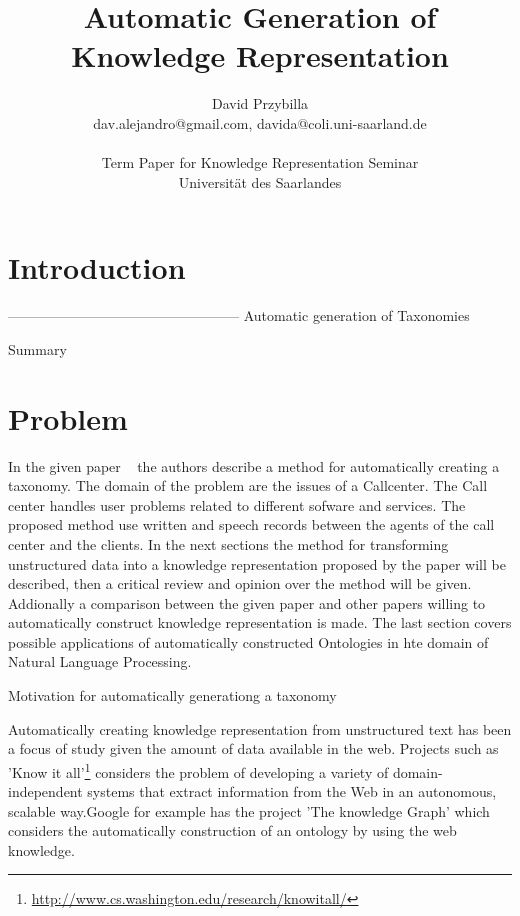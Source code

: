 \documentclass[4pt,a4paper,twocolumn]{article}
\author{David Przybilla\\dav.alejandro@gmail.com, davida@coli.uni-saarland.de\\ \\ Term Paper for Knowledge Representation Seminar\\ Universit\"{a}t des Saarlandes}
\title{Automatic Generation of Knowledge Representation}
\begin{document}
\twocolumn[
	 \begin{@twocolumnfalse}
    \maketitle
  \end{@twocolumnfalse}
 ]




\section{Introduction}





--------------------------------------------------
Automatic generation of Taxonomies

Summary

\section{Problem}
In the given paper ~\cite{Roy:2006:AGD:1220175.1220268} the authors describe a method for automatically creating a taxonomy.
The domain of the problem are the issues of a Callcenter. The Call center handles user problems related to different sofware and services.
The proposed method use  written and speech records between the agents of the call center and the clients. 
In the next sections  the method for transforming unstructured data into a knowledge representation proposed by the paper will be described,
then a critical review and opinion over the method will be given. Addionally a comparison between the given paper and other papers willing to automatically construct knowledge representation is made.
The last section covers  possible applications of automatically constructed Ontologies in hte domain of Natural Language Processing.


Motivation for automatically generationg a taxonomy

Automatically creating knowledge representation from unstructured text has been a focus of study given the amount of data available in the web.
Projects such as 'Know it all'\footnote{\url{http://www.cs.washington.edu/research/knowitall/}} considers the problem of developing a variety of domain-independent systems that extract information from the Web in an autonomous, scalable way.Google for example has the project 'The knowledge Graph' which considers the automatically construction of an ontology by using the web knowledge. 
\end{document}

